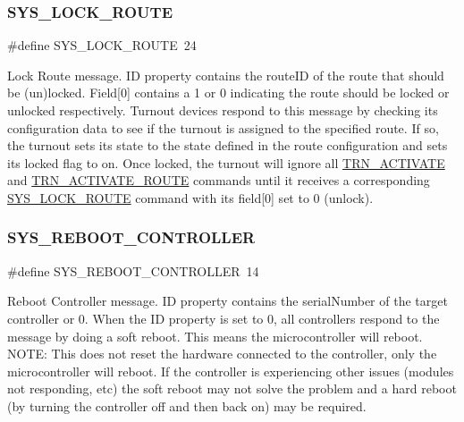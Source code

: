 \subsubsection{\texorpdfstring{S\+Y\+S\+\_\+\+L\+O\+C\+K\+\_\+\+R\+O\+U\+TE}{SYS\_LOCK\_ROUTE}}
{\footnotesize\ttfamily \#define S\+Y\+S\+\_\+\+L\+O\+C\+K\+\_\+\+R\+O\+U\+TE~24}

Lock Route message. ID property contains the route\+ID of the route that should be (un)locked. Field\mbox{[}0\mbox{]} contains a 1 or 0 indicating the route should be locked or unlocked respectively. Turnout devices respond to this message by checking its configuration data to see if the turnout is assigned to the specified route. If so, the turnout sets its state to the state defined in the route configuration and sets its locked flag to on. Once locked, the turnout will ignore all \hyperlink{group___u_d_p_message_i_d_gab5a0eacfbf0cfab134534d10890d5c25}{T\+R\+N\+\_\+\+A\+C\+T\+I\+V\+A\+TE} and \hyperlink{group___u_d_p_message_i_d_ga44d53121d88631ed14d77f8b6a405816}{T\+R\+N\+\_\+\+A\+C\+T\+I\+V\+A\+T\+E\+\_\+\+R\+O\+U\+TE} commands until it receives a corresponding \hyperlink{group___u_d_p_message_i_d_ga9ba07526db57f9ec44d01fe3eba9cc60}{S\+Y\+S\+\_\+\+L\+O\+C\+K\+\_\+\+R\+O\+U\+TE} command with its field\mbox{[}0\mbox{]} set to 0 (unlock). \mbox{\label{group___u_d_p_message_i_d_gae5a140537bdeb16c6f8ac38ee7a841f6}} 
\subsubsection{\texorpdfstring{S\+Y\+S\+\_\+\+R\+E\+B\+O\+O\+T\+\_\+\+C\+O\+N\+T\+R\+O\+L\+L\+ER}{SYS\_REBOOT\_CONTROLLER}}
{\footnotesize\ttfamily \#define S\+Y\+S\+\_\+\+R\+E\+B\+O\+O\+T\+\_\+\+C\+O\+N\+T\+R\+O\+L\+L\+ER~14}

Reboot Controller message. ID property contains the serial\+Number of the target controller or 0. When the ID property is set to 0, all controllers respond to the message by doing a soft reboot. This means the microcontroller will reboot. N\+O\+TE\+: This does not reset the hardware connected to the controller, only the microcontroller will reboot. If the controller is experiencing other issues (modules not responding, etc) the soft reboot may not solve the problem and a hard reboot (by turning the controller off and then back on) may be required. \mbox{\label{group___u_d_p_message_i_d_ga30863a10d0fcf12b2664d572864c4e0f}} 

